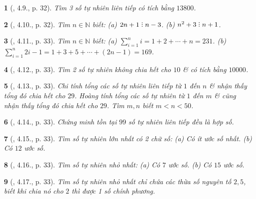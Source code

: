 \documentclass{article}
\newtheorem{baitoan}{}
\DeclareRobustCommand{\divby}{%
	\mathrel{\vbox{\baselineskip.65ex\lineskiplimit0pt\hbox{.}\hbox{.}\hbox{.}}}%
}
\begin{document}
\begin{baitoan}[\cite{TLCT_THCS_Toan_6_so_hoc}, 4.9., p. 32]
	Tìm 3 số tự nhiên liên tiếp có tích bằng $13800$.
\end{baitoan}

\begin{baitoan}[\cite{TLCT_THCS_Toan_6_so_hoc}, 4.10., p. 32]
	Tìm $n\in\mathbb{N}$ biết: (a) $2n + 1\divby n - 3$. (b) $n^2 + 3\divby n + 1$.
\end{baitoan}

\begin{baitoan}[\cite{TLCT_THCS_Toan_6_so_hoc}, 4.11., p. 33]
	Tìm $n\in\mathbb{N}$ biết: (a) $\sum_{i=1}^n i = 1 + 2 + \cdots + n = 231$. (b) $\sum_{i=1}^n 2i - 1 = 1 + 3 + 5 + \cdots + (2n - 1) = 169$.
\end{baitoan}

\begin{baitoan}[\cite{TLCT_THCS_Toan_6_so_hoc}, 4.12., p. 33]
	Tìm 2 số tự nhiên không chia hết cho $10$ \& có tích bằng $10000$.
\end{baitoan}

\begin{baitoan}[\cite{TLCT_THCS_Toan_6_so_hoc}, 4.13., p. 33]
	Chi tính tổng các số tự nhiên liên tiếp từ $1$ đến $n$ \& nhận thấy tổng đó chia hết cho $29$. Hoàng tính tổng các số tự nhiên từ $1$ đến $m$ \& cũng nhận thấy tổng đó chia hết cho $29$. Tìm $m,n$ biết $m < n < 50$.
\end{baitoan}

\begin{baitoan}[\cite{TLCT_THCS_Toan_6_so_hoc}, 4.14., p. 33]
	Chứng minh tồn tại $99$ số tự nhiên liên tiếp đều là hợp số.
\end{baitoan}

\begin{baitoan}[\cite{TLCT_THCS_Toan_6_so_hoc}, 4.15., p. 33]
	Tìm số tự nhiên lớn nhất có 2 chữ số: (a) Có ít ước số nhất. (b) Có $12$ ước số.
\end{baitoan}

\begin{baitoan}[\cite{TLCT_THCS_Toan_6_so_hoc}, 4.16., p. 33]
	Tìm số tự nhiên nhỏ nhất: (a) Có $7$ ước số. (b) Có $15$ ước số.
\end{baitoan}

\begin{baitoan}[\cite{TLCT_THCS_Toan_6_so_hoc}, 4.17., p. 33]
	Tìm số tự nhiên nhỏ nhất chỉ chứa các thừa số nguyên tố $2,5$, biết khi chia nó cho $2$ thì được 1 số chính phương.
\end{baitoan}
\end{document}
